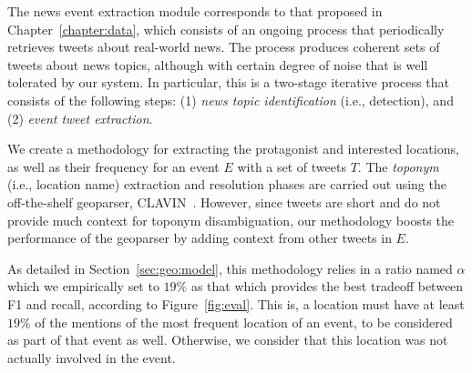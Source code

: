 %
The news event extraction module corresponds to that proposed in
Chapter~\ref{chapter:data}, which consists of an ongoing process that
periodically retrieves tweets about real-world news. 
%
The process produces coherent sets of tweets about news topics, although with
certain degree of noise that is well tolerated by our system. 
%
In particular, this is a two-stage iterative process that consists of the
following steps:
%
(1) {\em news topic identification} (i.e., detection), and 
%
(2) {\em event tweet extraction}. 


\smallskip
{}
%
We create a methodology for extracting the protagonist and interested locations,
as well as their frequency for an event $E$ with a set of tweets $T$.  
%
The {\em toponym} (i.e., location name) extraction and resolution phases are
carried out using the off-the-shelf geoparser, CLAVIN~\cite{clavin}. 
%
However, since tweets are short and do not provide much context for toponym
disambiguation, our methodology boosts the performance of the geoparser by
adding context from other tweets in $E$.

As detailed in Section~\ref{sec:geo:model}, this methodology relies in a ratio
named $\alpha$ which we empirically set to $19\%$ as that which provides the
best tradeoff between F1 and recall, according to Figure~\ref{fig:eval}. 
%
This is, a location must have at least $19\%$ of the mentions of the most
frequent location of an event, to be considered as part of that event as well.
%
Otherwise, we consider that this location was not actually involved in the
event.